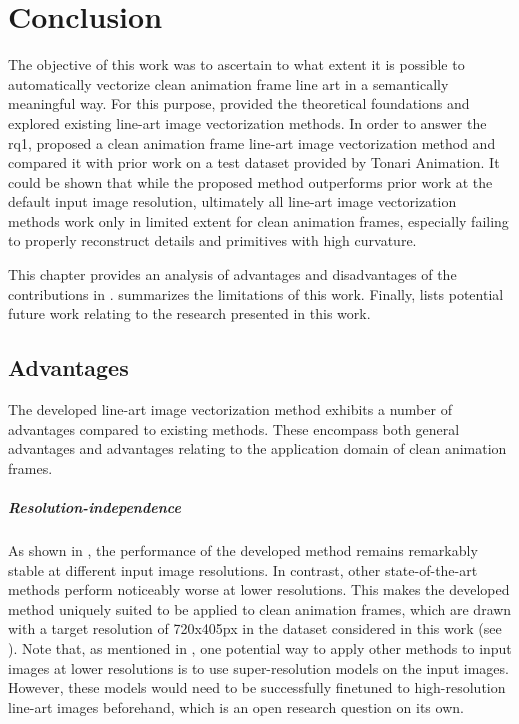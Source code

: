 \chapter{Conclusion}
\label{ch:conclusio}

The objective of this work was to ascertain to what extent it is possible to automatically vectorize clean animation frame line art in a semantically meaningful way. For this purpose,  provided the theoretical foundations and  explored existing line-art image vectorization methods. In order to answer the \gls{rq1},  proposed a clean animation frame line-art image vectorization method and compared it with prior work on a test dataset provided by Tonari Animation. It could be shown that while the proposed method outperforms prior work at the default input image resolution, ultimately all line-art image vectorization methods work only in limited extent for clean animation frames, especially failing to properly reconstruct details and primitives with high curvature.

This chapter provides an analysis of advantages and disadvantages of the contributions in .  summarizes the limitations of this work. Finally,  lists potential future work relating to the research presented in this work.

\section{Advantages}
\label{sec:conclusio.analysis}

The developed line-art image vectorization method exhibits a number of advantages compared to existing methods. These encompass both general advantages and advantages relating to the application domain of clean animation frames.

\paragraph{Resolution-independence}

As shown in , the performance of the developed method remains remarkably stable at different input image resolutions. In contrast, other state-of-the-art methods perform noticeably worse at lower resolutions. This makes the developed method uniquely suited to be applied to clean animation frames, which are drawn with a target resolution of 720x405px in the dataset considered in this work (see ). Note that, as mentioned in , one potential way to apply other methods to input images at lower resolutions is to use super-resolution models \citep{DBLP:journals/pami/DongLHT16} on the input images. However, these models would need to be successfully finetuned to high-resolution line-art images beforehand, which is an open research question on its own.

